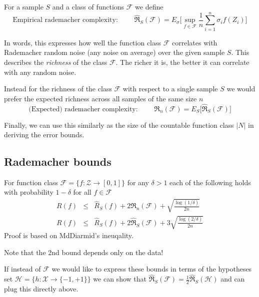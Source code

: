 For a sample $S$ and a class of functions $\mathcal{F}$ we define
\begin{equation}
\text{Empirical rademacher complexity: } \qquad \widehat{\mathfrak{R}}_S(\mathcal{F}) = 
E_\sigma \Big[ \sup_{f \in \mathcal{F}} \frac{1}{n} \sum_{i=1}^{n} \sigma_i f(Z_i) \Big]
\end{equation}

In words, this expresses how well the function class $\mathcal{F}$ correlates with  Rademacher random noise (any noise on average) over the given sample $S$.
This describes the \emph{richness} of the class $\mathcal{F}$. The richer it is, the better it can correlate with any random noise.

Instead for the richness of the class $\mathcal{F}$ with respect to a single sample $S$ we would prefer the expected richness across all samples of the same size $n$
\begin{equation}
\text{(Expected) rademacher complexity: } \qquad \mathfrak{R}_n(\mathcal{F}) = E_S \Big[ \widehat{\mathfrak{R}}_S(\mathcal{F}) \Big]
\end{equation}

Finally, we can use this similarly as the size of the countable function class $|N|$ in deriving the error bounds.

\subsection{Rademacher bounds}

For function class $\mathcal{F} = \{ f : \mathcal{Z} \to [0,1] \}$ for any $\delta>1$ each of the following holds with probability $1-\delta$ for all $f \in \mathcal{F}$
\begin{eqnarray}
R(f) & \leq & \widehat{R}_S(f) + 2 \mathfrak{R}_n(\mathcal{F}) + \sqrt{\frac{\log(1/\delta)}{2n}} \\
R(f) & \leq & \widehat{R}_S(f) + 2 \widehat{\mathfrak{R}}_S(\mathcal{F}) + 3\sqrt{\frac{\log(2/\delta)}{2n}} 
\end{eqnarray}
Proof is based on MdDiarmid's ineuqality.

Note that the 2nd bound depends only on the data!

If instead of $\mathcal{F}$ we would like to express these bounds in terms of the hypotheses set $\mathcal{H} = \{h: \mathcal{X} \to \{-1,+1\} \}$ we can show that $\widehat{\mathfrak{R}}_S(\mathcal{F}) = \frac{1}{2}\widehat{\mathfrak{R}}_S(\mathcal{H})$ and can plug this directly above.

